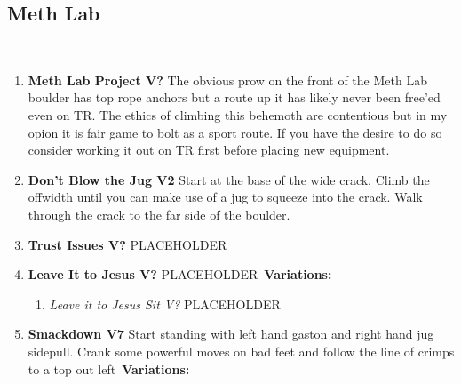 \subsection*{Meth Lab}\label{bf:Meth Lab}
\

\begin{enumerate}[]
	\item\label{rt:Meth Lab Project} \colorbox{black!20}{\textbf{Meth Lab Project V?  \warn \warn \warn } }
	\newline The obvious prow on the front of the Meth Lab boulder has top rope anchors but a route up it has likely never been free'ed even on TR. The ethics of climbing this behemoth are contentious but in my opion it is fair game to bolt as a sport route. If you have the desire to do so consider working it out on TR first before placing new equipment.\
	\item\label{rt:Don't Blow the Jug} \colorbox{green!20}{\textbf{Don't Blow the Jug V2  } }
	\newline Start at the base of the wide crack. Climb the offwidth until you can make use of a jug to squeeze into the crack. Walk through the crack to the far side of the boulder.\
	\item\label{rt:Trust Issues} \colorbox{black!20}{\textbf{Trust Issues V?  \warn \warn } }
	\newline PLACEHOLDER\
	\item\label{rt:Leave It to Jesus} \colorbox{black!20}{\textbf{Leave It to Jesus V?  } }
	\newline PLACEHOLDER\
	\newline \textbf{Variations:}
	\begin{enumerate}
		\item\label{vr:Leave it to Jesus Sit} \colorbox{black!20}{\emph{Leave it to Jesus Sit V?  }  }
		\newline PLACEHOLDER\
	\end{enumerate}
	\item\label{rt:Smackdown} \colorbox{Goldenrod!50}{\textbf{Smackdown V7      } }
	\newline Start standing with left hand gaston and right hand jug sidepull. Crank some powerful moves on bad feet and follow the line of crimps to a top out left\
	\newline \textbf{Variations:}
	\begin{enumerate}

\end{enumerate}
\end{enumerate}
